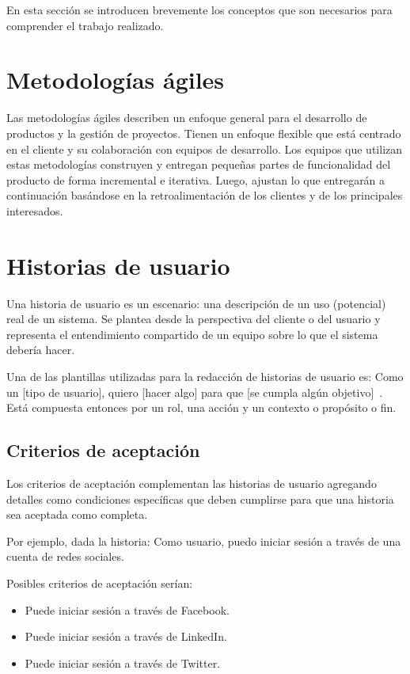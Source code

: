 En esta sección se introducen brevemente los conceptos que son necesarios para comprender el trabajo realizado.
\section{Metodologías ágiles}
\label{sec:metodologias_agiles}

Las metodologías ágiles describen un enfoque general para el desarrollo de productos y la gestión de proyectos. Tienen un enfoque flexible que está centrado en el cliente y su colaboración con equipos de desarrollo. Los equipos que utilizan estas metodologías construyen y entregan pequeñas partes de funcionalidad del producto de forma incremental e iterativa. Luego, ajustan lo que entregarán a continuación basándose en la retroalimentación de los clientes y de los principales interesados.~\cite{cohan_agile}
\section{Historias de usuario}
\label{sec:historias_de_usuario}
Una historia de usuario es un escenario: una descripción de un uso (potencial) real de un sistema. Se plantea desde la perspectiva del cliente o del usuario y representa el entendimiento compartido de un equipo sobre lo que el sistema debería hacer.~\cite{wake_definition}

Una de las plantillas utilizadas para la redacción de historias de usuario es: Como un [tipo de usuario], quiero [hacer algo] para que [se cumpla algún objetivo]~\cite{cohn_user_stories_applied}. Está compuesta entonces por un rol, una acción y un contexto o propósito o fin.
\subsection{Criterios de aceptación}
\label{sec:criterios_aceptacion}

Los criterios de aceptación complementan las historias de usuario agregando detalles como condiciones específicas que deben cumplirse para que una historia sea aceptada como completa.~\cite{cohan_details}

Por ejemplo, dada la historia: Como usuario, puedo iniciar sesión a través de una cuenta de redes sociales.

Posibles criterios de aceptación serían:
\begin{itemize}
    \item Puede iniciar sesión a través de Facebook.
    \item Puede iniciar sesión a través de LinkedIn.
    \item Puede iniciar sesión a través de Twitter.
\end{itemize}

